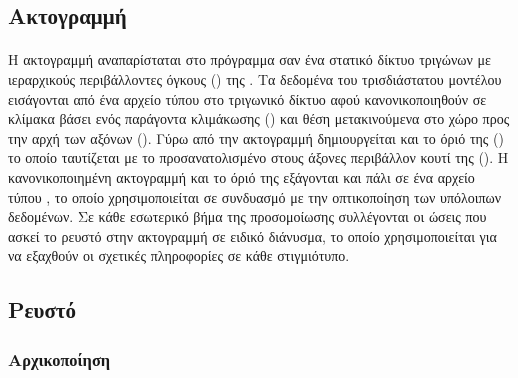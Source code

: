 \subsection{Ακτογραμμή}
\paragraph{} Η ακτογραμμή αναπαρίσταται στο πρόγραμμα σαν ένα στατικό δίκτυο τριγώνων με
ιεραρχικούς περιβάλλοντες όγκους () της . Τα δεδομένα
του τρισδιάστατου μοντέλου εισάγονται από ένα αρχείο τύπου  στο τριγωνικό δίκτυο
αφού κανονικοποιηθούν σε κλίμακα βάσει ενός παράγοντα κλιμάκωσης ()
και θέση μετακινούμενα στο χώρο προς την αρχή των αξόνων (). Γύρω από την
ακτογραμμή δημιουργείται και το όριό της () το οποίο ταυτίζεται με
το προσανατολισμένο στους άξονες περιβάλλον κουτί της (). Η κανονικοποιημένη
ακτογραμμή και το όριό της εξάγονται και πάλι σε ένα αρχείο τύπου , το οποίο
χρησιμοποιείται σε συνδυασμό με την οπτικοποίηση των υπόλοιπων δεδομένων. Σε κάθε
εσωτερικό βήμα της προσομοίωσης συλλέγονται οι ώσεις που ασκεί το ρευστό στην ακτογραμμή
σε ειδικό διάνυσμα, το οποίο χρησιμοποιείται για να εξαχθούν οι σχετικές πληροφορίες σε
κάθε στιγμιότυπο.

\subsection{Ρευστό}
\subsubsection{Αρχικοποίηση}
\label{sssec:fluid-init}
